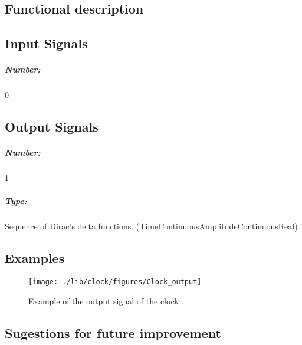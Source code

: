 \subsection*{Functional description}


\pagebreak

\subsection*{Input Signals}

\subparagraph*{Number:} 0

\subsection*{Output Signals}

\subparagraph*{Number:} 1

\subparagraph*{Type:} Sequence of Dirac's delta functions. (TimeContinuousAmplitudeContinuousReal)

\subsection*{Examples}

\begin{figure}[h]
	\centering
	\texttt{[image: ./lib/clock/figures/Clock\_output]}
	\caption{Example of the output signal of the clock}\label{Clock_output}
\end{figure}

\subsection*{Sugestions for future improvement}

